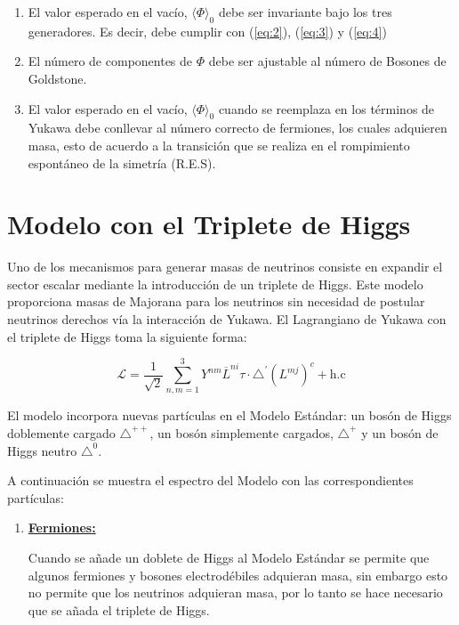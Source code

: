 \documentclass[12pt]{article}
\begin{document}
\begin{enumerate}
\begin{enumerate}
\item El valor esperado en el vacío,  \(\langle \Phi \rangle_0  \) debe ser invariante bajo los tres generadores. Es decir, debe cumplir con  (\ref{eq:2}), (\ref{eq:3}) y (\ref{eq:4})

\item El número de componentes de \(\Phi  \) debe ser ajustable al número de Bosones de Goldstone.

\item El valor esperado en el vacío,  \(\langle \Phi \rangle_0  \)  cuando se reemplaza en los términos de Yukawa debe conllevar al número correcto de fermiones, los cuales adquieren masa, esto de acuerdo a la transición que se realiza en el rompimiento espontáneo de la simetría (R.E.S). 
\end{enumerate}

\section{Modelo con el Triplete de Higgs}

Uno de los mecanismos para generar masas de neutrinos consiste en expandir el sector escalar mediante la introducción de un triplete de Higgs. Este modelo proporciona masas de Majorana para los neutrinos sin necesidad de postular neutrinos derechos vía la interacción de Yukawa. El Lagrangiano de Yukawa con el triplete de Higgs toma la siguiente forma:

\begin{equation}
    \mathcal{L}= \frac{1}{\sqrt{2}} \sum_{n,m=1}^3 Y^{nm} \overline{L}^{ni}\tau \cdot \triangle^{'} ({L^{mj}})^{c} + \text{h.c} 
    \label{eq:7}
\end{equation} 

El modelo incorpora nuevas partículas en el Modelo Estándar: un bosón de Higgs doblemente cargado \(\triangle^{++} \), un bosón simplemente cargados, \(\triangle^{+} \) y un bosón de Higgs neutro \(\triangle^{0} \). 

A continuación se muestra el espectro del Modelo con las correspondientes partículas: 


\begin{enumerate}
\item \underline{ \textbf{Fermiones:}}

Cuando se añade un doblete de Higgs al Modelo Estándar se permite que algunos fermiones y bosones electrodébiles adquieran masa, sin embargo esto no permite que los neutrinos adquieran masa, por lo tanto se hace necesario que se añada el triplete de Higgs. \\ 


\end{enumerate}
\end{enumerate}
\end{document}
